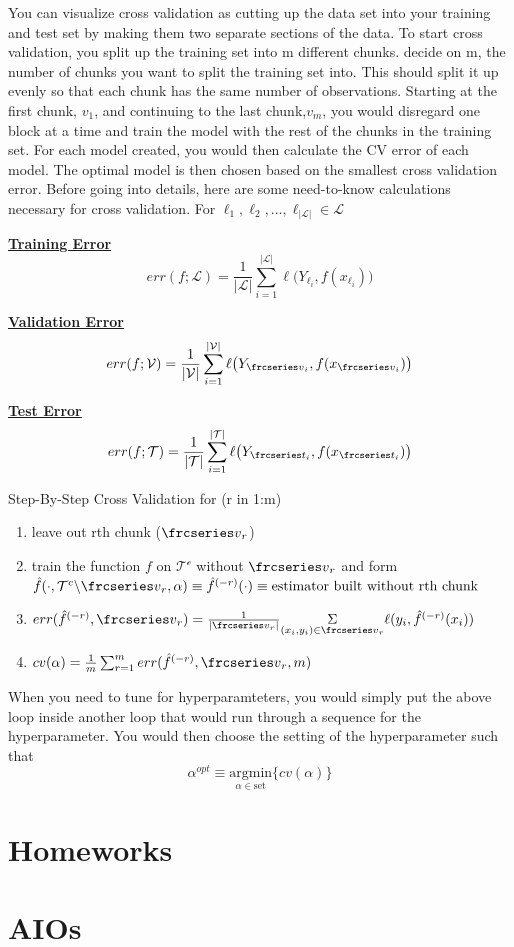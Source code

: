 \documentclass[a4paper]{article}
\newcommand{\textfrc}[1]{{\frcseries#1}}
\begin{document}
You can visualize cross validation as cutting up the data set into your training and test set by making them two separate sections of the data. To start cross validation, you split up the training set into m different chunks. 
 decide on m, the number of chunks you want to split the training set into. This should split it up evenly so that each chunk has the same number of observations. Starting at the first chunk, $v_1$, and continuing to the last chunk,$v_m$, you would disregard one block at a time and train the model with the rest of the chunks in the training set. For each model created, you would then calculate the CV error of each model. The optimal model is then chosen based on the smallest cross validation error. Before going into details, here are some need-to-know  calculations necessary for cross validation.
\bigskip
\newline For $\ell_1,\ell_2,\dots,\ell_{|\mathcal{L}|}\in\mathcal{L}$

\underline{\textbf{Training Error}}\linebreak
$$err(f;\mathcal{L})=\frac{1}{|\mathcal{L}|}\sum_{i=1}^{|\mathcal{L}|}\ell\big(Y_{\ell_{i}},f(x_{\ell_{i}})\big)$$

\underline{\textbf{Validation Error}}\linebreak
$$err(f;\mathcal{V})=\frac{1}{|\mathcal{V}|}\sum_{i=1}^{|\mathcal{V}|}\ell\big(Y_{\textfrc{v}_{i}},f(x_{\textfrc{v}_{i}})\big)$$

\underline{\textbf{Test Error}}\linebreak
$$err(f;\mathcal{T})=\frac{1}{|\mathcal{T}|}\sum_{i=1}^{|\mathcal{T}|}\ell\big(Y_{\textfrc{t}_{i}},f(x_{\textfrc{t}_{i}})\big)$$

Step-By-Step Cross Validation
\newline for (r in 1:m)
\begin{enumerate}
\item leave out rth chunk ($\textfrc{v}_r$)
\item train the function $f$ on $\mathcal{T^c}$ without $\textfrc{v}_r$ and form $\hat{f}(\cdot,\mathcal{T}^c\backslash\textfrc{v}_r,\alpha)\equiv \hat{f}^{(-r)}(\cdot)\equiv \text{estimator built without rth chunk}$
\item $err(\hat{f}^{(-r)},\textfrc{v}_r)=\frac{1}{|\textfrc{v}_r|}\underset{(x_i,y_i)\in\textfrc{v}_r}{\Sigma}\ell(y_i,\hat{f}^{(-r)}(x_i))$
\item $cv(\alpha)=\frac{1}{m}\sum_{r=1}^{m}err(\hat{f}^{(-r)},\textfrc{v}_r,m)$
\end{enumerate}

When you need to tune for hyperparamteters, you would simply put the above loop inside another loop that would run through a sequence for the hyperparameter. You would then choose the setting of the hyperparameter such that
$$\alpha^{opt}\equiv\underset{\alpha\in\text{set}}{\text{argmin}}\{cv(\alpha)\}$$


\section{Homeworks}

\section{AIOs}
\end{document}

